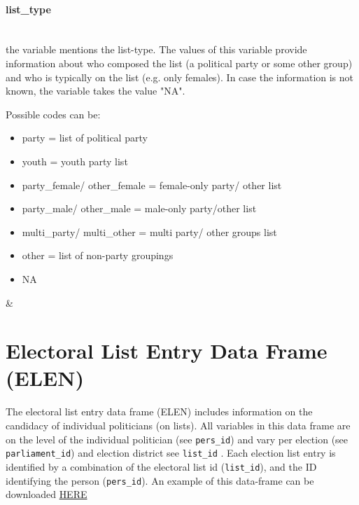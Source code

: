 \documentclass{article}
\begin{document}
  \paragraph{list\_type}\\
     the variable mentions the list-type. The values of this variable provide information about who composed the list (a political party or some other group) and who is typically on the list (e.g. only females). In case the information is not known, the variable takes the value "NA".
    
    Possible codes can be:
     \begin{itemize}
        \item party = list of political party
        \item youth = youth party list
        \item party\_female/ other\_female = female-only party/ other list
         \item party\_male/ other\_male = male-only party/other list
        \item multi\_party/ multi\_other = multi party/ other groups list
        \item other = list of non-party groupings
        \item NA
    \end{itemize} &


\section{Electoral List Entry Data Frame  (\gls{ELEN})}\label{ELEN}
The electoral list entry data frame (\gls{ELEN}) includes information on the candidacy of individual politicians (on lists). All variables in this data frame are on the level of the individual politician (see \texttt{pers\_id}) and vary per election (see \texttt{parliament\_id}) and election district see \texttt{list\_id} . Each election list entry is identified by a combination of the electoral list id (\texttt{list\_id}), and the ID identifying the person (\texttt{pers\_id}). An example of this data-frame can be downloaded \href{http://parliamentarycareersincomparison.org/wp-content/uploads/2017/03/PCC-example-data_v311.xlsx}{HERE}
\end{document}
